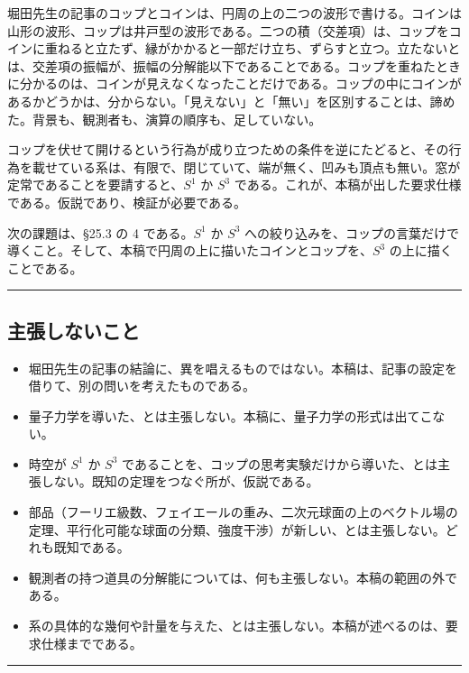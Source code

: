 \documentclass[
  a4paper,
]{ltjsarticle}
\providecommand{\tightlist}{%
  \setlength{\itemsep}{0pt}\setlength{\parskip}{0pt}}
\begin{document}
堀田先生の記事のコップとコインは、円周の上の二つの波形で書ける。コインは山形の波形、コップは井戸型の波形である。二つの積（交差項）は、コップをコインに重ねると立たず、縁がかかると一部だけ立ち、ずらすと立つ。立たないとは、交差項の振幅が、振幅の分解能以下であることである。コップを重ねたときに分かるのは、コインが見えなくなったことだけである。コップの中にコインがあるかどうかは、分からない。「見えない」と「無い」を区別することは、諦めた。背景も、観測者も、演算の順序も、足していない。

コップを伏せて開けるという行為が成り立つための条件を逆にたどると、その行為を載せている系は、有限で、閉じていて、端が無く、凹みも頂点も無い。窓が定常であることを要請すると、\(S^1\)
か \(S^3\)
である。これが、本稿が出した要求仕様である。仮説であり、検証が必要である。

次の課題は、§25.3 の 4 である。\(S^1\) か \(S^3\)
への絞り込みを、コップの言葉だけで導くこと。そして、本稿で円周の上に描いたコインとコップを、\(S^3\)
の上に描くことである。

\begin{center}\rule{0.5\linewidth}{0.5pt}\end{center}

\subsection{主張しないこと}\label{ux4e3bux5f35ux3057ux306aux3044ux3053ux3068}

\begin{itemize}
\tightlist
\item
  堀田先生の記事の結論に、異を唱えるものではない。本稿は、記事の設定を借りて、別の問いを考えたものである。
\item
  量子力学を導いた、とは主張しない。本稿に、量子力学の形式は出てこない。
\item
  時空が \(S^1\) か \(S^3\)
  であることを、コップの思考実験だけから導いた、とは主張しない。既知の定理をつなぐ所が、仮説である。
\item
  部品（フーリエ級数、フェイエールの重み、二次元球面の上のベクトル場の定理、平行化可能な球面の分類、強度干渉）が新しい、とは主張しない。どれも既知である。
\item
  観測者の持つ道具の分解能については、何も主張しない。本稿の範囲の外である。
\item
  系の具体的な幾何や計量を与えた、とは主張しない。本稿が述べるのは、要求仕様までである。
\end{itemize}

\begin{center}\rule{0.5\linewidth}{0.5pt}\end{center}
\end{document}
